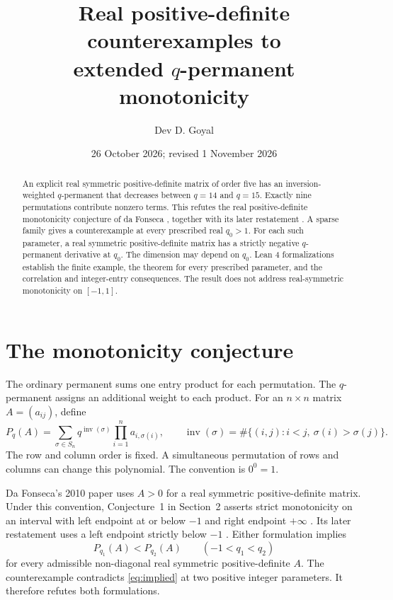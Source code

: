 \documentclass[11pt]{article}
\title{Real positive-definite counterexamples to\\ extended $q$-permanent monotonicity}
\author{Dev D. Goyal}
\date{26 October 2026; revised 1 November 2026}
\newcommand{\inv}{\operatorname{inv}}
\begin{document}
\maketitle
\begin{abstract}
An explicit real symmetric positive-definite matrix of order five has an inversion-weighted $q$-permanent that decreases between $q=14$ and $q=15$. Exactly nine permutations contribute nonzero terms. This refutes the real positive-definite monotonicity conjecture of da Fonseca \cite[Conjecture~1]{fonseca2010}, together with its later restatement \cite[Conjecture~2]{fonseca2018}. A sparse family gives a counterexample at every prescribed real $q_0>1$. For each such parameter, a real symmetric positive-definite matrix has a strictly negative $q$-permanent derivative at $q_0$. The dimension may depend on $q_0$. Lean 4 formalizations establish the finite example, the theorem for every prescribed parameter, and the correlation and integer-entry consequences. The result does not address real-symmetric monotonicity on $[-1,1]$.
\end{abstract}

\section{The monotonicity conjecture}\label{sec:intro}
The ordinary permanent sums one entry product for each permutation. The $q$-permanent assigns an additional weight to each product. For an $n\times n$ matrix $A=(a_{ij})$, define
\[
 P_q(A)=\sum_{\sigma\in S_n}q^{\inv(\sigma)}\prod_{i=1}^n a_{i,\sigma(i)},\qquad
 \inv(\sigma)=\#\{(i,j):i<j,\ \sigma(i)>\sigma(j)\}.
\]
The row and column order is fixed. A simultaneous permutation of rows and columns can change this polynomial. The convention is $0^0=1$.

Da Fonseca's 2010 paper uses $A>0$ for a real symmetric positive-definite matrix. Under this convention, Conjecture~1 in Section~2 asserts strict monotonicity on an interval with left endpoint at or below $-1$ and right endpoint $+\infty$ \cite{fonseca2010}. Its later restatement uses a left endpoint strictly below $-1$ \cite[Conjecture~2]{fonseca2018}. Either formulation implies
\begin{equation}\label{eq:implied}
 P_{q_1}(A)<P_{q_2}(A)\qquad(-1<q_1<q_2)
\end{equation}
for every admissible non-diagonal real symmetric positive-definite $A$. The counterexample contradicts \eqref{eq:implied} at two positive integer parameters. It therefore refutes both formulations.
\end{document}
